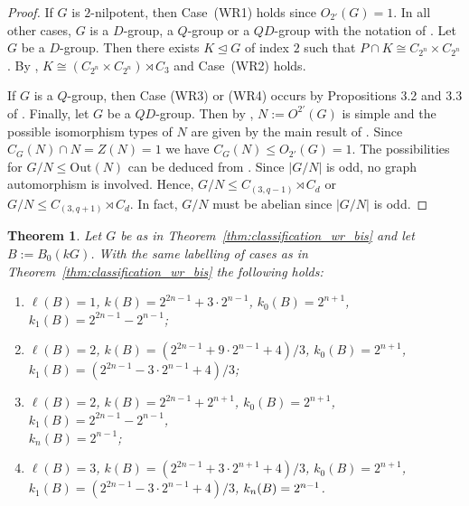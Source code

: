 \documentclass[12pt,a4paper]{amsart}
\theoremstyle{plain}\newtheorem{Theorem}{Theorem}[section]
\theoremstyle{plain}\newtheorem{Conjecture}[Theorem]{Conjecture}
\theoremstyle{plain}\newtheorem{Corollary}[Theorem]{Corollary}
\theoremstyle{plain}\newtheorem{Lemma}[Theorem]{Lemma}
\theoremstyle{plain}\newtheorem{Proposition}[Theorem]{Proposition}
\theoremstyle{definition}\newtheorem{Definition}[Theorem]{Definition}
\theoremstyle{definition}\newtheorem{Example}[Theorem]{Example}
\theoremstyle{definition}\newtheorem{Examples}[Theorem]{Examples}
\theoremstyle{definition}\newtheorem{Remark}[Theorem]{Remark}
\theoremstyle{definition}\newtheorem{Question}[Theorem]{Question}
\theoremstyle{definition}\newtheorem{Notation}[Theorem]{Notation}
\theoremstyle{definition}\newtheorem{Hypothesis}[Theorem]{Hypothesis}
\theoremstyle{definition}\newtheorem{Assumption}[Theorem]{Assumption}
\theoremstyle{definition}\newtheorem{Strategy}[Theorem]{Strategy}
\theoremstyle{definition}\newtheorem{Contents}[Theorem]{Contents}
\theoremstyle{definition}\newtheorem{Computations}[Theorem]{Computations}
\theoremstyle{definition}\newtheorem{Equivalences}[Theorem]{Equivalences}
\theoremstyle{definition}\newtheorem{Notation/Definition}[Theorem]{Notation/Definition}
\theoremstyle{definition}\newtheorem{noth}[Theorem]{}
\theoremstyle{plain}\newtheorem{Step}[Theorem]{Step}
\newcommand{\PGL}{\operatorname{PGL}}
\newcommand{\Out}{{\text{Out}}}
\begin{document}
\begin{proof}
If $G$ is $2$-nilpotent, then Case~{\rm\sf (WR1)} holds since $O_{2'}(G) = 1$. 
In all other cases, $G$ is a $D$-group, a $Q$-group or a $QD$-group with the notation of 
\cite[Definition~2.1]{ABG70}.
Let $G$ be a $D$-group. Then there exists $K\unlhd G$ of index $2$ such that 
$P\cap K\cong C_{2^n}\times C_{2^n}$. By \cite[Theorem~1]{Bra64}, 
$K\cong (C_{2^n}\times C_{2^n})\rtimes C_3$ and Case~{\rm\sf (WR2)} holds.

If $G$ is a $Q$-group, then Case {\rm\sf (WR3)} or {\rm\sf (WR4)} 
occurs by Propositions 3.2 and 3.3 of \cite{ABG70}.
Finally, let $G$ be a $QD$-group. Then by \cite[Proposition 2.2]{ABG70}, 
$N:=O^{2'}(G)$ is simple and the 
possible isomorphism types of $N$ are given by the main result of \cite{ABG73}. 
Since $C_G(N)\cap N=Z(N)=1$ we have $C_G(N)\le O_{2'}(G)=1$. 
The possibilities for $G/N\le\Out(N)$ can be deduced from \cite{Atlas}. 
Since $|G/N|$ is odd, no graph 
automorphism is involved. Hence, $G/N\le C_{(3,q-1)}\rtimes C_d$ or 
$G/N\le C_{(3,q+1)}\rtimes C_d$. In 
fact, $G/N$ must be abelian since $|G/N|$ is odd.
\end{proof}

\begin{Theorem}\label{thm:k(B)l(B)} 
Let $G$ be as in Theorem~\ref{thm:classification_wr_bis} and let $B:=B_0(kG)$. 
With the same labelling of 
cases as in Theorem~\ref{thm:classification_wr_bis} the following \smallskip holds:
\begin{enumerate}[leftmargin=20mm]
\item[{\rm\sf (WR1)\phantom{,4}}] $\ell(B)=1$, $k(B)=2^{2n-1}+3\cdot 2^{n-1}$, $k_0(B)=2^{n+1}$, 
$k_1(B)=2^{2n-1}-2^{n-1}$;
\item[{\rm\sf (WR2)\phantom{,4}}] $\ell(B)=2$, $k(B)=(2^{2n-1}+9\cdot 2^{n-1}+4)/3$, $k_0(B)=2^{n+1}$,\\
$k_1(B)=(2^{2n-1}-3\cdot 2^{n-1}+4)/3$; %
\item[{\rm\sf (WR3,4)}] $\ell(B)=2$, $k(B)=2^{2n-1}+2^{n+1}$, $k_0(B)=2^{n+1}$, 
$k_1(B)=2^{2n-1}-2^{n-1}$,\\ $k_n(B)=2^{n-1}$;
\item[{\rm\sf (WR5,6)}] $\ell(B)=3$, $k(B)=(2^{2n-1}+3\cdot 2^{n+1}+4)/3$, $k_0(B)=2^{n+1}$,\\ 
$k_1(B)=(2^{2n-1}-3\cdot 2^{n-1}+4)/3$, $k_{\color{black}n}(B)=2^{n-1}$.
\end{enumerate}
\end{Theorem} 
\end{document}

